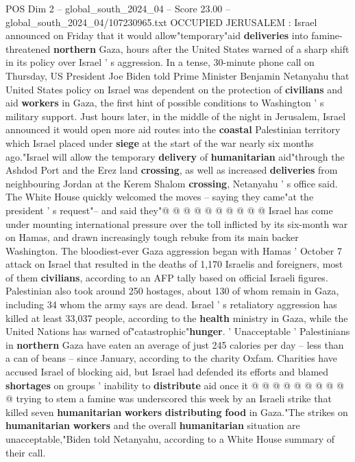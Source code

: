 \begin{textsample}{POS Dim 2 – global\_south\_2024\_04 – Score 23.00 – global\_south\_2024\_04/107230965.txt}  \label{ex:f2_pos_157}
OCCUPIED JERUSALEM : Israel announced on Friday that it would allow"temporary"aid \textbf{deliveries} into famine-threatened \textbf{northern} Gaza, hours after the United States warned of a sharp shift in its policy over Israel ' s aggression.
In a tense, 30-minute phone call on Thursday, US President Joe Biden told Prime Minister Benjamin Netanyahu that United States policy on Israel was dependent on the protection of \textbf{civilians} and aid \textbf{workers} in Gaza, the first hint of possible conditions to Washington ' s military support.
Just hours later, in the middle of the night in Jerusalem, Israel announced it would open more aid routes into the \textbf{coastal} Palestinian territory which Israel placed under \textbf{siege} at the start of the war nearly six months ago."Israel will allow the temporary \textbf{delivery} of \textbf{humanitarian} aid"through the Ashdod Port and the Erez land \textbf{crossing}, as well as increased \textbf{deliveries} from neighbouring Jordan at the Kerem Shalom \textbf{crossing}, Netanyahu ' s office said.
The White House quickly welcomed the moves -- saying they came"at the president ' s request"-- and said they"@ @ @ @ @ @ @ @ @ @ Israel has come under mounting international pressure over the toll inflicted by its six-month war on Hamas, and drawn increasingly tough rebuke from its main backer Washington.
The bloodiest-ever Gaza aggression began with Hamas ' October 7 attack on Israel that resulted in the deaths of 1,170 Israelis and foreigners, most of them \textbf{civilians}, according to an AFP tally based on official Israeli figures.
Palestinian also took around 250 hostages, about 130 of whom remain in Gaza, including 34 whom the army says are dead.
Israel ' s retaliatory aggression has killed at least 33,037 people, according to the \textbf{health} ministry in Gaza, while the United Nations has warned of"catastrophic"\textbf{hunger}. ' Unacceptable ' Palestinians in \textbf{northern} Gaza have eaten an average of just 245 calories per day -- less than a can of beans -- since January, according to the charity Oxfam.
Charities have accused Israel of blocking aid, but Israel had defended its efforts and blamed \textbf{shortages} on groups ' inability to \textbf{distribute} aid once it @ @ @ @ @ @ @ @ @ @ trying to stem a famine was underscored this week by an Israeli strike that killed seven \textbf{humanitarian} \textbf{workers} \textbf{distributing} \textbf{food} in Gaza."The strikes on \textbf{humanitarian} \textbf{workers} and the overall \textbf{humanitarian} situation are unacceptable,"Biden told Netanyahu, according to a White House summary of their call.

\end{textsample}
